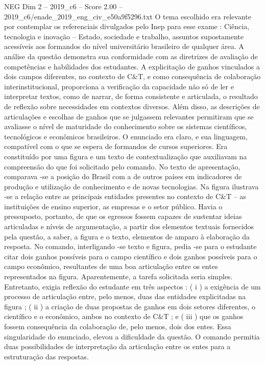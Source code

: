 \begin{textsample}{NEG Dim 2 – 2019\_c6 – Score 2.00 – 2019\_c6/enade\_2019\_eng\_civ\_e50a9f5296.txt}
O tema escolhido era relevante por contemplar os referenciais divulgados pelo Inep para esse exame : Ciência, tecnologia e inovação – Estado, sociedade e trabalho, assuntos supostamente acessíveis aos formandos do nível universitário brasileiro de qualquer área.
A análise da questão demonstra sua conformidade com as diretrizes de avaliação de competências e habilidades dos estudantes.
A explicitação de ganhos vinculados a dois campos diferentes, no contexto de C\&T, e como consequência de colaboração interinstitucional, proporciona a verificação da capacidade não só de ler e interpretar textos, como de narrar, de forma consistente e articulada, o resultado de reflexão sobre necessidades em contextos diversos.
Além disso, as descrições de articulações e escolhas de ganhos que se julgassem relevantes permitiram que se avaliasse o nível de maturidade do conhecimento sobre os sistemas científicos, tecnológicos e econômicos brasileiros.
O enunciado era claro, e sua linguagem, compatível com o que se espera de formandos de cursos superiores.
Era constituído por uma figura e um texto de contextualização que auxiliavam na compreensão do que foi solicitado pelo comando.
No texto de apresentação, comparava -se a posição do Brasil com a de outros países em indicadores de produção e utilização de conhecimento e de novas tecnologias.
Na figura ilustrava -se a relação entre as principais entidades presentes no contexto de C\&T – as instituições de ensino superior, as empresas e o setor público.
Havia o pressuposto, portanto, de que os egressos fossem capazes de sustentar ideias articuladas e níveis de argumentação, a partir dos elementos textuais fornecidos pela questão, a saber, a figura e o texto, elementos de amparo à elaboração da resposta.
No comando, interligando -se texto e figura, pedia -se para o estudante citar dois ganhos possíveis para o campo científico e dois ganhos possíveis para o campo econômico, resultantes de uma boa articulação entre os entes representados na figura.
Aparentemente, a tarefa solicitada seria simples.
Entretanto, exigia reflexão do estudante em três aspectos : ( i ) a exigência de um processo de articulação entre, pelo menos, duas das entidades explicitadas na figura ; ( ii ) a criação de duas propostas de ganhos em dois setores diferentes, o científico e o econômico, ambos no contexto de C\&T ; e ( iii ) que os ganhos fossem consequência da colaboração de, pelo menos, dois dos entes.
Essa singularidade do enunciado, elevou a dificuldade da questão.
O comando permitia duas possibilidades de interpretação da articulação entre os entes para a estruturação das respostas.

\end{textsample}
